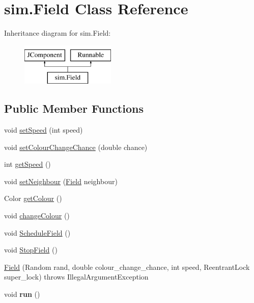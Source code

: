 \hypertarget{classsim_1_1_field}{}\section{sim.\+Field Class Reference}
\label{classsim_1_1_field}
Inheritance diagram for sim.\+Field\+:\begin{figure}[H]
\begin{center}
\leavevmode
\includegraphics[height=2.000000cm]{classsim_1_1_field}
\end{center}
\end{figure}
\subsection*{Public Member Functions}
\begin{DoxyCompactItemize}
\item 
void \hyperlink{classsim_1_1_field_a6a42c9b7dfcbb948ccf89351358575fd}{set\+Speed} (int speed)
\item 
void \hyperlink{classsim_1_1_field_abeb32b6171955cae5e65a1c2f0d9819a}{set\+Colour\+Change\+Chance} (double chance)
\item 
int \hyperlink{classsim_1_1_field_aacac61a31d2b8da325e306f4040e7929}{get\+Speed} ()
\item 
void \hyperlink{classsim_1_1_field_af65ffe349f271f67977fa98707711908}{set\+Neighbour} (\hyperlink{classsim_1_1_field}{Field} neighbour)
\item 
Color \hyperlink{classsim_1_1_field_a5ad0b86ec796915ff1588c37937b58b6}{get\+Colour} ()
\item 
void \hyperlink{classsim_1_1_field_ae0f6d5b684a2cc8800a6cf6c3763cad3}{change\+Colour} ()
\item 
void \hyperlink{classsim_1_1_field_a4efbcf3a218e4aa1ef448ce7b145e0a2}{Schedule\+Field} ()
\item 
void \hyperlink{classsim_1_1_field_a1d7072dab1f7a54d9ca0698e03edb6b6}{Stop\+Field} ()
\item 
\hyperlink{classsim_1_1_field_ae7740288b2977c923876876936a8a3e7}{Field} (Random rand, double colour\+\_\+change\+\_\+chance, int speed, Reentrant\+Lock super\+\_\+lock)  throws Illegal\+Argument\+Exception
\item 
void {\bfseries run} ()\hypertarget{classsim_1_1_field_a45d95ea1b7811cafdc14d0f0a79385d8}{}\label{classsim_1_1_field_a45d95ea1b7811cafdc14d0f0a79385d8}

\end{DoxyCompactItemize}
